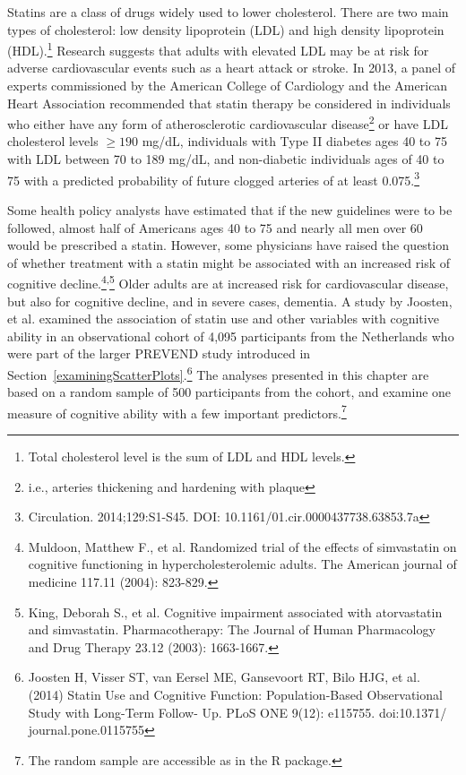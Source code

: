 Statins are a class of drugs widely used to lower cholesterol. There are two main types of cholesterol: low density lipoprotein (LDL) and high density lipoprotein (HDL).\footnote{Total cholesterol level is the sum of LDL and HDL levels.} Research suggests that adults with elevated LDL may be at risk for adverse cardiovascular events such as a heart attack or stroke. In 2013, a panel of experts commissioned by the American College of Cardiology and the American Heart Association recommended that statin therapy be considered in individuals who either have any form of atherosclerotic cardiovascular disease\footnote{i.e., arteries thickening and hardening with plaque} or have LDL cholesterol levels $\geq 190$ mg/dL, individuals with Type II diabetes ages 40 to 75 with LDL between 70 to 189 mg/dL, and non-diabetic individuals ages of 40 to 75 with a predicted probability of future clogged arteries of at least 0.075.\footnote{Circulation. 2014;129:S1-S45. DOI: 10.1161/01.cir.0000437738.63853.7a}

Some health policy analysts have estimated that if the new guidelines were to be followed, almost half of Americans ages 40 to 75 and nearly all men over 60 would be prescribed a statin. However, some physicians have raised the question of whether treatment with a statin might be associated with an increased risk of cognitive decline.\footnote{Muldoon, Matthew F., et al. Randomized trial of the effects of simvastatin on cognitive functioning in hypercholesterolemic adults. The American journal of medicine 117.11 (2004): 823-829.}\textsuperscript{,}\footnote{King, Deborah S., et al. Cognitive impairment associated with atorvastatin and simvastatin. Pharmacotherapy: The Journal of Human Pharmacology and Drug Therapy 23.12 (2003): 1663-1667.} Older adults are at increased risk for cardiovascular disease, but also for cognitive decline, and in severe cases, dementia. A study by Joosten, et al. examined the association of statin use and other variables with cognitive ability in an observational cohort of 4,095 participants from the Netherlands who were part of the larger PREVEND study introduced in Section~\ref{examiningScatterPlots}.\footnote{Joosten H, Visser ST, van Eersel ME, Gansevoort RT, Bilo HJG, et al. (2014) Statin Use and Cognitive Function: Population-Based Observational Study with Long-Term Follow- Up. PLoS ONE 9(12): e115755. doi:10.1371/ journal.pone.0115755} The analyses presented in this chapter are based on a random sample of 500 participants from the cohort, and examine one measure of cognitive ability with a few important predictors.\footnote{The random sample are accessible as  in the  \textsf{R} package.}


